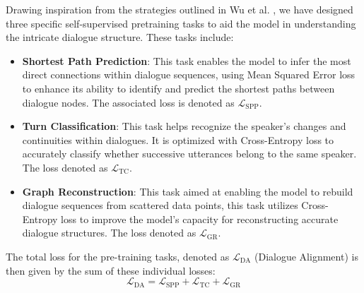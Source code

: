 \documentclass[letterpaper]{article} %
\begin{document}

Drawing inspiration from the strategies outlined in Wu et al. \cite{wu-etal-2023-gnn-pretrain}, we have designed three specific self-supervised pretraining tasks to aid the model in understanding the intricate dialogue structure. These tasks include:

\begin{itemize}
\item  \textbf{Shortest Path Prediction}: This task enables the model to infer the most direct connections within dialogue sequences, using Mean Squared Error loss to enhance its ability to identify and predict the shortest paths between dialogue nodes. The associated loss is denoted as $\mathcal{L}_{\text{SPP}}$.

\item \textbf{Turn Classification}: This task helps recognize the speaker's changes and continuities within dialogues. It is optimized with Cross-Entropy loss to accurately classify whether successive utterances belong to the same speaker. The loss denoted as $\mathcal{L}_{\text{TC}}$.

\item \textbf{Graph Reconstruction}: This task aimed at enabling the model to rebuild dialogue sequences from scattered data points, this task utilizes Cross-Entropy loss to improve the model's capacity for reconstructing accurate dialogue structures. The loss denoted as $\mathcal{L}_{\text{GR}}$.
\end{itemize}

The total loss for the pre-training tasks, denoted as $\mathcal{L}_{\text{DA}}$ (Dialogue Alignment) is then given by the sum of these individual losses:
\begin{equation}
    \mathcal{L}_{\text{DA}} = \mathcal L_{\text{SPP}} + \mathcal L_{\text{TC}} + \mathcal L_{\text{GR}}
\end{equation}
\end{document}
